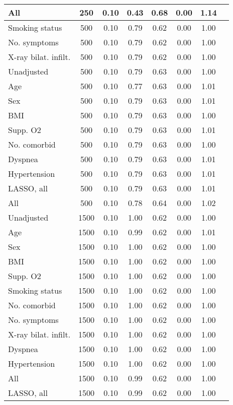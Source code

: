 \documentclass{article}
\begin{document}
{\begin{longtable}{lccccccc}
All & 250 & 0.10 & 0.43 & 0.68 & 0.00 & 1.14 \\ \midrule 
Smoking status & 500 & 0.10 & 0.79 & 0.62 & 0.00 & 1.00 \\ 
No. symptoms & 500 & 0.10 & 0.79 & 0.62 & 0.00 & 1.00 \\ 
X-ray bilat. infilt. & 500 & 0.10 & 0.79 & 0.62 & 0.00 & 1.00 \\ 
Unadjusted & 500 & 0.10 & 0.79 & 0.63 & 0.00 & 1.00 \\ 
Age & 500 & 0.10 & 0.77 & 0.63 & 0.00 & 1.01 \\ 
Sex & 500 & 0.10 & 0.79 & 0.63 & 0.00 & 1.01 \\ 
BMI & 500 & 0.10 & 0.79 & 0.63 & 0.00 & 1.00 \\ 
Supp. O2 & 500 & 0.10 & 0.79 & 0.63 & 0.00 & 1.01 \\ 
No. comorbid & 500 & 0.10 & 0.79 & 0.63 & 0.00 & 1.00 \\ 
Dyspnea & 500 & 0.10 & 0.79 & 0.63 & 0.00 & 1.01 \\ 
Hypertension & 500 & 0.10 & 0.79 & 0.63 & 0.00 & 1.01 \\ 
LASSO, all & 500 & 0.10 & 0.79 & 0.63 & 0.00 & 1.01 \\ 
All & 500 & 0.10 & 0.78 & 0.64 & 0.00 & 1.02 \\ \midrule 
Unadjusted & 1500 & 0.10 & 1.00 & 0.62 & 0.00 & 1.00 \\ 
Age & 1500 & 0.10 & 0.99 & 0.62 & 0.00 & 1.01 \\ 
Sex & 1500 & 0.10 & 1.00 & 0.62 & 0.00 & 1.00 \\ 
BMI & 1500 & 0.10 & 1.00 & 0.62 & 0.00 & 1.00 \\ 
Supp. O2 & 1500 & 0.10 & 1.00 & 0.62 & 0.00 & 1.00 \\ 
Smoking status & 1500 & 0.10 & 1.00 & 0.62 & 0.00 & 1.00 \\ 
No. comorbid & 1500 & 0.10 & 1.00 & 0.62 & 0.00 & 1.00 \\ 
No. symptoms & 1500 & 0.10 & 1.00 & 0.62 & 0.00 & 1.00 \\ 
X-ray bilat. infilt. & 1500 & 0.10 & 1.00 & 0.62 & 0.00 & 1.00 \\ 
Dyspnea & 1500 & 0.10 & 1.00 & 0.62 & 0.00 & 1.00 \\ 
Hypertension & 1500 & 0.10 & 1.00 & 0.62 & 0.00 & 1.00 \\ 
All & 1500 & 0.10 & 0.99 & 0.62 & 0.00 & 1.00 \\ 
LASSO, all & 1500 & 0.10 & 0.99 & 0.62 & 0.00 & 1.00 \\
\bottomrule
\hline
\end{longtable}
}
\end{document}
